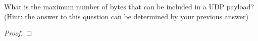 \documentclass[../../main.tex]{subfiles}
\begin{document}
\begin{wts}
What is the maximum number of bytes that can be included in a UDP payload?  (Hint: the answer to this question can be determined by your previous answer) 
\end{wts}
\begin{proof}

\end{proof}
\end{document}
